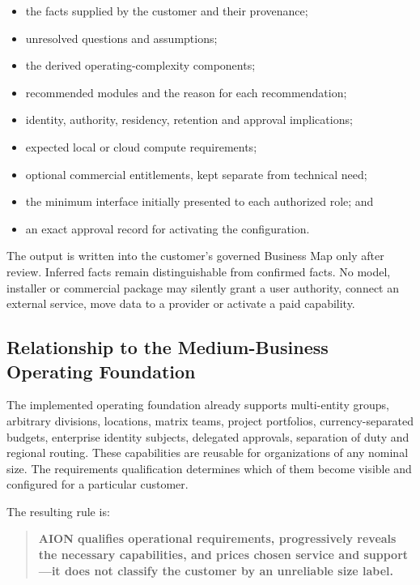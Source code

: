 \begin{itemize}
  \item the facts supplied by the customer and their provenance;
  \item unresolved questions and assumptions;
  \item the derived operating-complexity components;
  \item recommended modules and the reason for each recommendation;
  \item identity, authority, residency, retention and approval implications;
  \item expected local or cloud compute requirements;
  \item optional commercial entitlements, kept separate from technical need;
  \item the minimum interface initially presented to each authorized role; and
  \item an exact approval record for activating the configuration.
\end{itemize}

The output is written into the customer's governed Business Map only after review.  Inferred facts
remain distinguishable from confirmed facts.  No model, installer or commercial package may silently
grant a user authority, connect an external service, move data to a provider or activate a paid
capability.

\subsection{Relationship to the Medium-Business Operating Foundation}

The implemented operating foundation already supports multi-entity groups, arbitrary divisions,
locations, matrix teams, project portfolios, currency-separated budgets, enterprise identity
subjects, delegated approvals, separation of duty and regional routing.  These capabilities are
reusable for organizations of any nominal size.  The requirements qualification determines which
of them become visible and configured for a particular customer.

The resulting rule is:

\begin{quote}
\textbf{AION qualifies operational requirements, progressively reveals the necessary capabilities,
and prices chosen service and support---it does not classify the customer by an unreliable size label.}
\end{quote}
